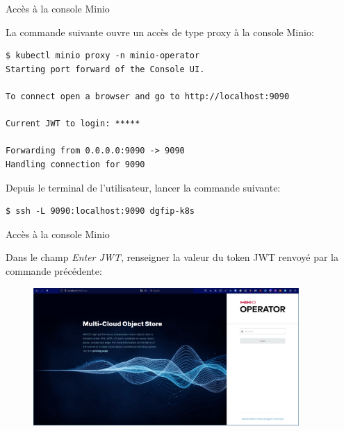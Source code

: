 
\begin{frame}[fragile]{Accès à la console Minio}

   La commande suivante ouvre un accès de type proxy à la console Minio:
\begin{tiny}
\begin{Verbatim}[commandchars=\&\#\#]
$ kubectl minio proxy -n minio-operator
Starting port forward of the Console UI.

To connect open a browser and go to http://localhost:9090

Current JWT to login: *****

Forwarding from 0.0.0.0:9090 -> 9090
Handling connection for 9090

\end{Verbatim}
\end{tiny}

Depuis le terminal de l'utilisateur, lancer la commande suivante:

\begin{tiny}
\begin{Verbatim}[commandchars=\&\#\#]
$ ssh -L 9090:localhost:9090 dgfip-k8s
\end{Verbatim}
\end{tiny}

\end{frame}


\begin{frame}[fragile]{Accès à la console Minio}

   Dans le champ \textit{Enter JWT}, renseigner la valeur du token JWT renvoyé par la commande précédente:
\begin{figure}
\begin{center}
\includegraphics[angle=0, width=0.9\textwidth, height=0.7\textheight]{images/login_console_minio.eps}
\end{center}
\end{figure}

\end{frame}

